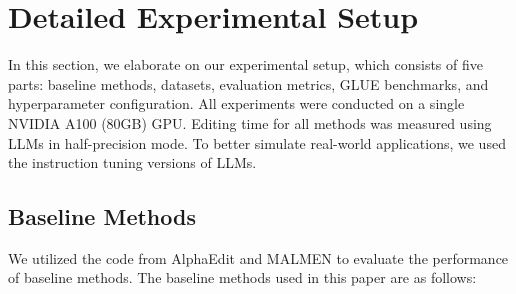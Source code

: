 \section{Detailed Experimental Setup}
\label{app:setup}
In this section, we elaborate on our experimental setup, which consists of five parts: baseline methods, datasets, evaluation metrics, GLUE benchmarks, and hyperparameter configuration. All experiments were conducted on a single NVIDIA A100 (80GB) GPU. Editing time for all methods was measured using LLMs in half-precision mode. To better simulate real-world applications, we used the instruction tuning versions of LLMs.

\subsection{Baseline Methods}
We utilized the code from AlphaEdit and MALMEN to evaluate the performance of baseline methods. The baseline methods used in this paper are as follows:
